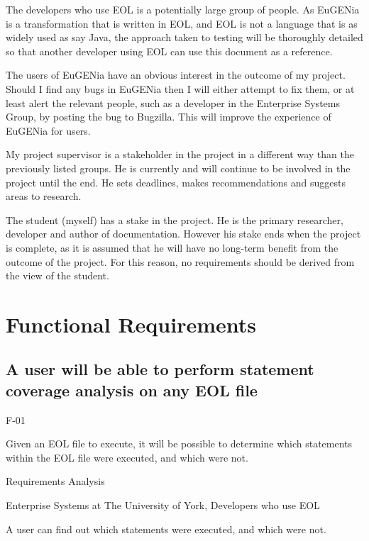 The developers who use EOL is a potentially large group of people. As EuGENia is a transformation that is written in EOL, and EOL is not a language that is as widely used as say Java, the approach taken to testing will be thoroughly detailed so that another developer using EOL can use this document as a reference.

The users of EuGENia have an obvious interest in the outcome of my project. Should I find any bugs in EuGENia then I will either attempt to fix them, or at least alert the relevant people, such as a developer in the Enterprise Systems Group, by posting the bug to Bugzilla. This will improve the experience of EuGENia for users.

My project supervisor is a stakeholder in the project in a different way than the previously listed groups. He is currently and will continue to be involved in the project until the end. He sets deadlines, makes recommendations and suggests areas to research.

The student (myself) has a stake in the project. He is the primary researcher, developer and author of documentation. However his stake ends when the project is complete, as it is assumed that he will have no long-term benefit from the outcome of the project. For this reason, no requirements should be derived from the view of the student.

\section{Functional Requirements}

\subsection{A user will be able to perform statement coverage analysis on any EOL file}
\begin{description}[style=sameline,leftmargin=4.5cm,nolistsep]
\item[\hspace*{0.3cm}Label] F-01
\item[\hspace*{0.3cm}Description] Given an EOL file to execute, it will be possible to determine which statements within the EOL file were executed, and which were not.
\item[\hspace*{0.3cm}Source] Requirements Analysis
\item[\hspace*{0.3cm}Stakeholders] Enterprise Systems at The University of York, Developers who use EOL
\item[\hspace*{0.3cm}Satisfiable Conditions] A user can find out which statements were executed, and which were not.
\end{description}

